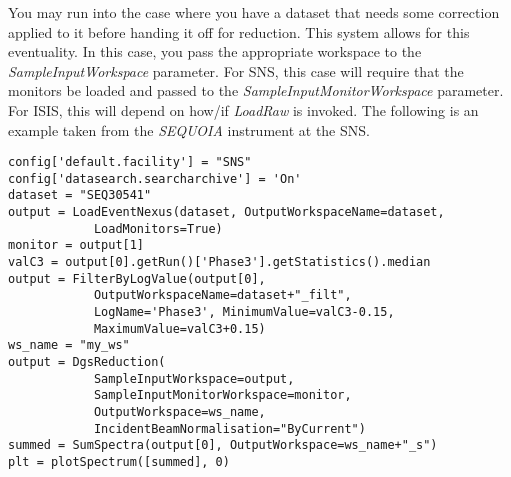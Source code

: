 You may run into the case where you have a dataset that needs some correction applied to it before handing it off for reduction. This system allows for this eventuality. In this case, you pass the appropriate workspace to the \textit{SampleInputWorkspace} parameter. For SNS, this case will require that the monitors be loaded and passed to the \textit{SampleInputMonitorWorkspace} parameter. For ISIS, this will depend on how/if \textit{LoadRaw} is invoked. The following is an example taken from the \textit{SEQUOIA} instrument at the SNS. 
\begin{verbatim}
config['default.facility'] = "SNS"
config['datasearch.searcharchive'] = 'On'
dataset = "SEQ30541"
output = LoadEventNexus(dataset, OutputWorkspaceName=dataset, 
            LoadMonitors=True)
monitor = output[1]
valC3 = output[0].getRun()['Phase3'].getStatistics().median
output = FilterByLogValue(output[0], 
            OutputWorkspaceName=dataset+"_filt", 
            LogName='Phase3', MinimumValue=valC3-0.15, 
            MaximumValue=valC3+0.15)
ws_name = "my_ws"
output = DgsReduction(
            SampleInputWorkspace=output,
            SampleInputMonitorWorkspace=monitor,
            OutputWorkspace=ws_name,
            IncidentBeamNormalisation="ByCurrent")
summed = SumSpectra(output[0], OutputWorkspace=ws_name+"_s")
plt = plotSpectrum([summed], 0)            
\end{verbatim}